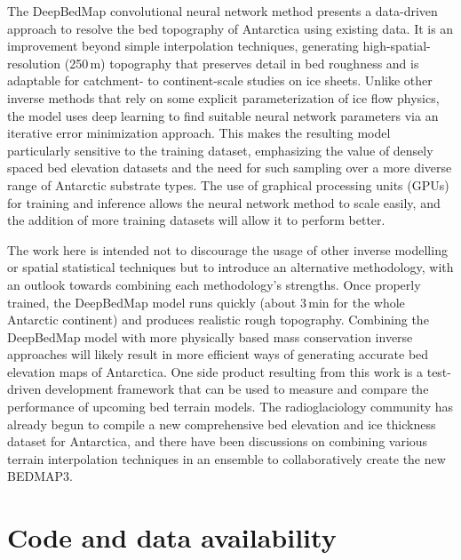 The DeepBedMap convolutional neural network method presents a data-driven approach to resolve the bed topography of Antarctica using existing data.
It is an improvement beyond simple interpolation techniques, generating high-spatial-resolution (250\,\unit{m}) topography that preserves detail in bed roughness and is adaptable for catchment- to continent-scale studies on ice sheets.
Unlike other inverse methods that rely on some explicit parameterization of ice flow physics, the model uses deep learning to find suitable neural network parameters via an iterative error minimization approach.
This makes the resulting model particularly sensitive to the training dataset, emphasizing the value of densely spaced bed elevation datasets and the need for such sampling over a more diverse range of Antarctic substrate types.
The use of graphical processing units (GPUs) for training and inference allows the neural network method to scale easily, and the addition of more training datasets will allow it to perform better.

The work here is intended not to discourage the usage of other inverse modelling or spatial statistical techniques but to introduce an alternative methodology, with an outlook towards combining each methodology's strengths.
Once properly trained, the DeepBedMap model runs quickly (about 3\,min for the whole Antarctic continent) and produces realistic rough topography.
Combining the DeepBedMap model with more physically based mass conservation inverse approaches \citep[e.g.][]{MorlighemDeepglacialtroughs2019} will likely result in more efficient ways of generating accurate bed elevation maps of Antarctica.
One side product resulting from this work is a test-driven development framework that can be used to measure and compare the performance of upcoming bed terrain models.
The radioglaciology community has already begun to compile a new comprehensive bed elevation and ice thickness dataset for Antarctica, and there have been discussions on combining various terrain interpolation techniques in an ensemble to collaboratively create the new BEDMAP3.



\section{Code and data availability}

